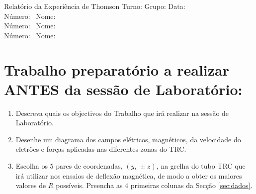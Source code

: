 \documentclass[a4paper,12pt]{article}  %
\author{Prof. Bernardo B. Carvalho}
\date{ Outubro 2015}
\newcommand{\HRule}{\rule{\linewidth}{0.5mm}}
\begin{document}
 



{  \sf  Relatório da Experiência de Thomson} %
Turno:\underline{\makebox[1.5cm][l]{~}} Grupo:\underline{\makebox[1.5cm][l]{~}} Data:\underline{\makebox[1.5cm][l]{~}}\\
\noindent Número:~\underline{\makebox[2cm][r]{~}} Nome:~\underline{\makebox[10cm][r]{~}} \\
\noindent Número:~\underline{\makebox[2cm][r]{~}} Nome:~\underline{\makebox[10cm][r]{~}} \\
\noindent Número:~\underline{\makebox[2cm][r]{~}} Nome:~\underline{\makebox[10cm][r]{~}} 


\section{\sf Trabalho preparatório a realizar ANTES da sessão de Laboratório:}
\begin{enumerate}
\item Descreva quais os objectivos do Trabalho que irá realizar na sessão de Laboratório. 
\item Desenhe um diagrama dos campos elétricos, magnéticos, da velocidade do eletrões e forças aplicadas nas diferentes zonas do TRC.
\item Escolha os 5 pares de coordenadas, $(y,\, \pm z)$, na grelha do tubo TRC que irá utilizar nos ensaios de deflexão magnética, de modo a obter os maiores valores  de $R$ possíveis. Preencha as 4 primeiras colunas da Secção \ref{sec:dados}.
\end{enumerate}
\end{document}
